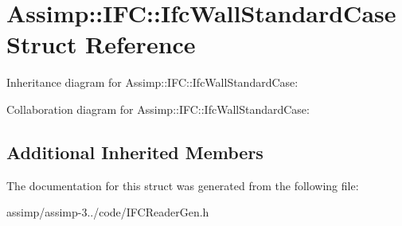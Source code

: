 \hypertarget{struct_assimp_1_1_i_f_c_1_1_ifc_wall_standard_case}{\section{Assimp\+:\+:I\+F\+C\+:\+:Ifc\+Wall\+Standard\+Case Struct Reference}
\label{struct_assimp_1_1_i_f_c_1_1_ifc_wall_standard_case}
}


Inheritance diagram for Assimp\+:\+:I\+F\+C\+:\+:Ifc\+Wall\+Standard\+Case\+:


Collaboration diagram for Assimp\+:\+:I\+F\+C\+:\+:Ifc\+Wall\+Standard\+Case\+:
\subsection*{Additional Inherited Members}


The documentation for this struct was generated from the following file\+:\begin{DoxyCompactItemize}
\item 
assimp/assimp-\/3../code/I\+F\+C\+Reader\+Gen.\+h\end{DoxyCompactItemize}
